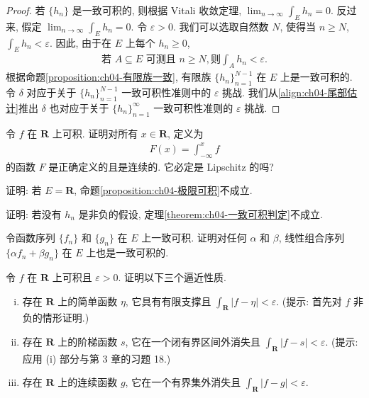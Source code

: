 \documentclass[../../main.tex]{subfiles}
\begin{document}
\begin{proof}
若 $\{h_{n}\}$ 是一致可积的, 则根据 Vitali 收敛定理, $\lim_{n\to\infty}\int_{E}h_{n}=0$. 反过来, 假定 $\lim_{n\to\infty}\int_{E}h_{n}=0$. 令 $\varepsilon>0$. 我们可以选取自然数 $N$, 使得当 $n\geqslant N$, $\int_{E}h_{n}<\varepsilon$. 因此, 由于在 $E$ 上每个 $h_{n}\geqslant 0$,
\begin{align}
\text{若 }A\subseteq E\text{ 可测且 }n\geqslant N,\text{则}\int_{A}h_{n}<\varepsilon.\label{align:ch04-尾部估计}
\end{align}
根据命题\cref{proposition:ch04-有限族一致}, 有限族 $\{h_{n}\}_{n=1}^{N-1}$ 在 $E$ 上是一致可积的. 令 $\delta$ 对应于关于 $\{h_{n}\}_{n=1}^{N-1}$ 一致可积性准则中的 $\varepsilon$ 挑战. 我们从\eqref{align:ch04-尾部估计}推出 $\delta$ 也对应于关于 $\{h_{n}\}_{n=1}^{\infty}$ 一致可积性准则的 $\varepsilon$ 挑战.
\end{proof}

\begin{exercise}\label{exercise:ch04-40}
令 $f$ 在 $\mathbf{R}$ 上可积. 证明对所有 $x\in\mathbf{R}$, 定义为
\begin{align*}
F(x)=\int_{-\infty}^{x}f
\end{align*}
的函数 $F$ 是正确定义的且是连续的. 它必定是 Lipschitz 的吗?
\end{exercise}

\begin{exercise}\label{exercise:ch04-41}
证明: 若 $E=\mathbf{R}$, 命题\cref{proposition:ch04-极限可积}不成立.
\end{exercise}

\begin{exercise}\label{exercise:ch04-42}
证明: 若没有 $h_{n}$ 是非负的假设, 定理\cref{theorem:ch04-一致可积判定}不成立.
\end{exercise}

\begin{exercise}\label{exercise:ch04-43}
令函数序列 $\{f_{n}\}$ 和 $\{g_{n}\}$ 在 $E$ 上一致可积. 证明对任何 $\alpha$ 和 $\beta$, 线性组合序列 $\{\alpha f_{n}+\beta g_{n}\}$ 在 $E$ 上也是一致可积的.
\end{exercise}

\begin{exercise}\label{exercise:ch04-44}
令 $f$ 在 $\mathbf{R}$ 上可积且 $\varepsilon>0$. 证明以下三个逼近性质.
\begin{enumerate}[(i)]
\item 存在 $\mathbf{R}$ 上的简单函数 $\eta$, 它具有有限支撑且 $\int_{\mathbf{R}}|f-\eta|<\varepsilon$. (提示: 首先对 $f$ 非负的情形证明.)
\item 存在 $\mathbf{R}$ 上的阶梯函数 $s$, 它在一个闭有界区间外消失且 $\int_{\mathbf{R}}|f-s|<\varepsilon$. (提示: 应用 (i) 部分与第 3 章的习题 18.)
\item 存在 $\mathbf{R}$ 上的连续函数 $g$, 它在一个有界集外消失且 $\int_{\mathbf{R}}|f-g|<\varepsilon$.
\end{enumerate}
\end{exercise}
\end{document}
